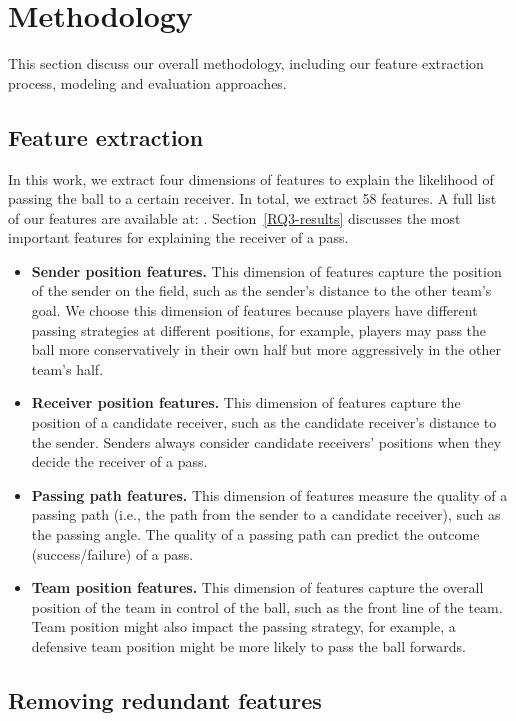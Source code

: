 \section{Methodology} \label{methodology}
This section discuss our overall methodology, including our feature extraction process, modeling and evaluation approaches.

\subsection{Feature extraction}

In this work, we extract four dimensions of features to explain the likelihood of passing the ball to a certain receiver. In total, we extract 58 features. A full list of our features are available at: . Section~\ref{RQ3-results} discusses the most important features for explaining the receiver of a pass.
\begin{itemize}
	\item \textbf{Sender position features.} This dimension of features capture the position of the sender on the field, such as the sender's distance to the other team's goal. We choose this dimension of features because players have different passing strategies at different positions, for example, players may pass the ball more conservatively in their own half but more aggressively in the other team's half.
	\item \textbf{Receiver position features.} This dimension of features capture the position of a candidate receiver, such as the candidate receiver's distance to the sender. Senders always consider candidate receivers' positions when they decide the receiver of a pass.
	\item \textbf{Passing path features.} This dimension of features measure the quality of a passing path (i.e., the path from the sender to a candidate receiver), such as the passing angle. The quality of a passing path can predict the outcome (success/failure) of a pass.
	\item \textbf{Team position features.} This dimension of features capture the overall position of the team in control of the ball, such as the front line of the team. Team position might also impact the passing strategy, for example, a defensive team position might be more likely to pass the ball forwards.
\end{itemize}

\subsection{Removing redundant features}

